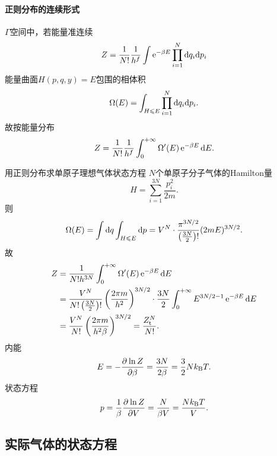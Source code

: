 \paragraph{正则分布的连续形式}$\varGamma$空间中，若能量准连续
\begin{align}
	Z=\frac1{N!}\frac1{h^f}\int\mathop{}\!\mathrm{e}^{-\beta E}\prod_{i=1}^N\mathop{}\!\mathrm{d} q_i\mathrm{d} p_i
\end{align}
能量曲面$H(p,q,y)=E$包围的相体积
\begin{align}
	\Omega(E)=\int_{H\leqslant E}\prod_{i=1}^N\mathop{}\!\mathrm{d} q_i\mathrm{d} p_i.
\end{align}
故按能量分布
\begin{align}
	Z=\frac1{N!}\frac1{h^f}\int_0^{+\infty}\Omega'(E)\mathop{}\!\mathrm{e}^{-\beta E}\mathop{}\!\mathrm{d} E.
\end{align}
\begin{example}{用正则分布求单原子理想气体状态方程}{}
	$N$个单原子分子气体的Hamilton量
	\[
		H=\sum_{i=1}^{3N}\frac{p_i^2}{2m}.
	\]
	则
	\[
		\Omega(E)=\int\mathop{}\!\mathrm{d} q\int_{H\leqslant E}\mathop{}\!\mathrm{d} p=V^N\cdot\frac{\pi^{3N/2}}{\left(\frac{3N}2\right)!}(2mE)^{3N/2}.
	\]
	故
	\begin{align*}
		Z&=\frac1{N!h^{3N}}\int\zti\Omega'(E)\e{-\beta E}\d E\\
		&=\frac{V^N}{N!\kh{\frac{3N}2}!}\kh{\frac{2\pi m}{h^2}}^{3N/2}\cdot\frac{3N}2\int\zti E^{3N/2-1}\e{-\beta E}\d E\\
		&%
		=\frac{V^N}{N!}\kh{\frac{2\pi m}{h^2\beta}}^{3N/2}=\frac{Z_\tl^N}{N!}.
	\end{align*}
	内能
	\begin{align}
		E=-\frac{\partial^{{}}\ln Z}{\partial{\beta}^{{}}}=\frac{3N}{2\beta}=\frac32Nk_{\mathrm B} T.
	\end{align}
	状态方程
	\begin{align}
		p=\frac1\beta\frac{\partial^{{}}\ln Z}{\partial{V}^{{}}}=\frac N{\beta V}=\frac{Nk_{\mathrm B} T}V.
	\end{align}
\end{example}

\subsection{实际气体的状态方程}

